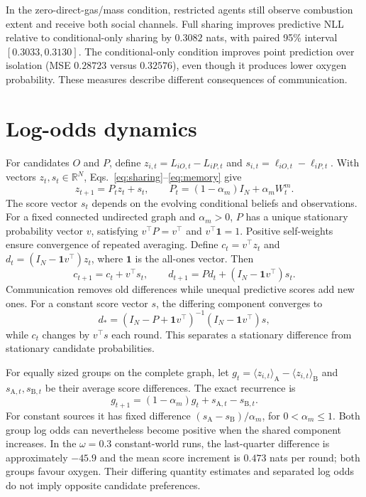 \documentclass[runningheads]{llncs}
\newcommand{\R}{\mathbb R}
\begin{document}
In the zero-direct-gas/mass condition, restricted agents still observe combustion
extent and receive both social channels. Full sharing improves predictive NLL
relative to conditional-only sharing by $0.3082$ nats, with paired 95\% interval
$[0.3033,0.3130]$. The conditional-only condition improves point prediction over
isolation (MSE $0.28723$ versus $0.32576$), even though it produces lower oxygen
probability. These measures describe different consequences of communication.

\section{Log-odds dynamics}
\label{app:dynamics}
For candidates $O$ and $P$, define
$z_{i,t}=L_{iO,t}-L_{iP,t}$ and
$s_{i,t}=\ell_{iO,t}-\ell_{iP,t}$. With vectors $z_t,s_t\in\R^N$,
Eqs.~\eqref{eq:sharing}--\eqref{eq:memory} give
\begin{equation}
 z_{t+1}=P_tz_t+s_t,\qquad P_t=(1-\alpha_m)I_N+\alpha_m W^m_t.
 \label{eq:log-odds}
\end{equation}
The score vector $s_t$ depends on the evolving conditional beliefs and observations.
For a fixed connected undirected graph and $\alpha_m>0$, $P$ has a unique
stationary probability vector $v$, satisfying $v^\top P=v^\top$ and
$v^\top\mathbf1=1$. Positive self-weights ensure convergence of repeated averaging.
Define $c_t=v^\top z_t$ and $d_t=(I_N-\mathbf1v^\top)z_t$, where $\mathbf1$ is
the all-ones vector. Then
\begin{equation}
 c_{t+1}=c_t+v^\top s_t,\qquad
 d_{t+1}=Pd_t+(I_N-\mathbf1v^\top)s_t.
 \label{eq:log-odds-components}
\end{equation}
Communication removes old differences while unequal predictive scores add new
ones. For a constant score vector $s$, the differing component converges to
\begin{equation}
 d_*=(I_N-P+\mathbf1v^\top)^{-1}(I_N-\mathbf1v^\top)s,
 \label{eq:stationary-gap}
\end{equation}
while $c_t$ changes by $v^\top s$ each round. This separates a stationary
difference from stationary candidate probabilities.

For equally sized groups on the complete graph, let
$g_t=\langle z_{i,t}\rangle_{\mathrm A}-\langle z_{i,t}\rangle_{\mathrm B}$ and
$s_{\mathrm A,t},s_{\mathrm B,t}$ be their average score differences. The exact
recurrence is
\begin{equation}
 g_{t+1}=(1-\alpha_m)g_t+s_{\mathrm A,t}-s_{\mathrm B,t}.
 \label{eq:camp-odds}
\end{equation}
For constant sources it has fixed difference
$(s_{\mathrm A}-s_{\mathrm B})/\alpha_m$, for $0<\alpha_m\leq1$.
Both group log odds can nevertheless become positive when the shared component
increases. In the $\omega=0.3$ constant-world runs, the last-quarter difference
is approximately $-45.9$ and the mean score increment is $0.473$ nats per round;
both groups favour oxygen. Their differing quantity estimates and separated
log odds do not imply opposite candidate preferences.
\end{document}

